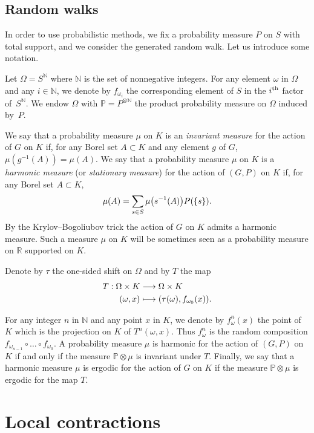 \documentclass[AHL,Unicode,longabstracts,published]{cedram}
\newcommand{\bbP}{\mathbb{P}}
\newcommand{\R}{\mathbb{R}}
\newcommand{\N}{\mathbb{N}}
\let\oldmapsto\mapsto
\renewcommand*{\mapsto}{\mathchoice{\longmapsto}{\oldmapsto}{\oldmapsto}{\oldmapsto}}
\renewcommand*{\to}{\mathchoice{\longrightarrow}{\rightarrow}{\rightarrow}{\rightarrow}}
\let\originalleft\left
\let\originalright\right
\renewcommand{\left}{\mathopen{}\mathclose\bgroup\originalleft}
\renewcommand{\right}{\aftergroup\egroup\originalright}
\newcommand{\R}{\mathbb{R}}
\begin{document}
\subsection{Random walks}\label{randomwalk}
In order to use probabilistic methods, we fix a probability measure $P$ on $S$ with total support, and we consider the generated random walk. Let us introduce some notation.

Let $\Omega=S^{\N}$ where $\N$ is the set of nonnegative integers. For any element $\omega$ in $\Omega$ and any $i \in \N$, we denote by $f_{\omega_{i}}$ the corresponding element of $S$ in the $i^{\rm th}$ factor of~$S^{\N}$. We endow $\Omega$ with $\bbP=P^{\otimes\N}$ the product probability measure on $\Omega$ induced by~$P$.

We say that a probability measure $\mu$ on $K$ is an \emph{invariant measure} for the action of $G$ on $K$ if, for any Borel set $A \subset K$ and any element $g$ of $G$, $\mu(g^{-1}(A))= \mu(A)$. We say that a probability measure $\mu$ on $K$ is a \emph{harmonic measure} (or \emph{stationary measure}) for the action of $(G,P)$ on $K$ if, for any Borel set $A \subset K$,
\[
\mu(A)= \sum _{s \in S} \mu\left(s^{-1}(A)\right)P(\{s\}).
\]
By the Krylov--Bogoliubov trick the action of $G$ on $K$ admits a harmonic measure. Such a measure $\mu$ on $K$ will be sometimes seen as a probability measure on $\R$ supported on $K$.

Denote by $\tau$ the one-sided shift on $\Omega$ and by $T$ the map
\begin{align*}
T:  \Omega \times K  &\to  \Omega \times K \\
 (\omega,x)  &\mapsto  (\tau(\omega),f_{\omega_{0}}(x)).
\end{align*}


For any integer $n$ in $\N$ and any point $x$ in $K$, we denote by $f_{\omega}^{n}(x)$ the point of $K$ which is the projection on $K$ of $T^{n}(\omega,x)$. Thus $f_{\omega}^n$ is the random composition $f_{\omega_{n-1}}\circ \dots \circ f_{\omega_0}$. A probability measure $\mu$ is harmonic for the action of $(G,P)$ on $K$ if and only if the measure $\bbP \otimes \mu$ is invariant under $T$. Finally, we say that a harmonic measure $\mu$ is ergodic for the action of $G$ on $K$ if the measure $\bbP \otimes \mu$ is ergodic for the map $T$.


\pagebreak
\section{Local contractions}
\end{document}
